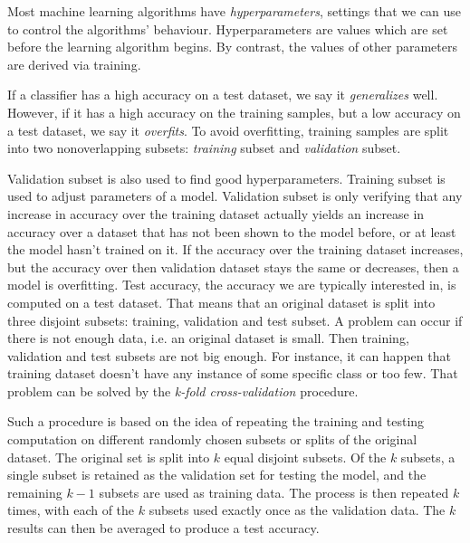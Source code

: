 Most machine learning algorithms have \textit{hyperparameters}, settings that we can use to control the algorithms' behaviour. Hyperparameters are values which are set before the learning algorithm begins. By contrast, the values of other parameters are derived via training. 

If a classifier has a high accuracy on a test dataset, we say it \textit{generalizes} well. However, if it has a high accuracy on the training samples, but a low accuracy on a test dataset, we say it \textit{overfits}. To avoid overfitting, training samples are split into two nonoverlapping subsets: \textit{training} subset and \textit{validation} subset.

Validation subset is also used to find good hyperparameters. Training subset is used to adjust parameters of a model. Validation subset is only verifying that any increase in accuracy over the training dataset actually yields an increase in accuracy over a dataset that has not been shown to the model before, or at least the model hasn't trained on it. If the accuracy over the training dataset increases, but the accuracy over then validation dataset stays the same or decreases, then a model is overfitting. Test accuracy, the accuracy we are typically interested in, is computed on a test dataset. That means that an original dataset is split into three disjoint subsets: training, validation and test subset. A problem can occur if there is not enough data, i.e. an original dataset is small. Then training, validation and test subsets are not big enough. For instance, it can happen that training dataset doesn't have any instance of some specific class or too few. That problem can be solved by the \textit{k-fold cross-validation} procedure.

Such a procedure is based on the idea of repeating the training and testing computation on different randomly chosen subsets or splits of the original dataset. The original set is split into $k$ equal disjoint subsets. Of the $k$ subsets, a single subset is retained as the validation set for testing the model, and the remaining $k-1$ subsets are used as training data. The process is then repeated $k$ times, with each of the $k$ subsets used exactly once as the validation data. The $k$ results can then be averaged to produce a test accuracy. 

  

